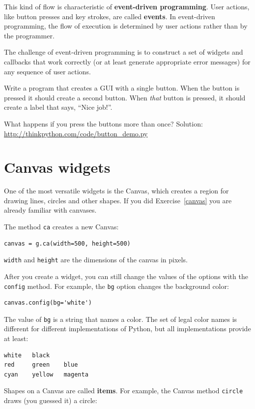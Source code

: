 \documentclass[10pt]{book}
\begin{document}
This kind of flow is characteristic of {\bf event-driven programming}.
User actions, like button presses and key strokes, are called {\bf
events}.  In event-driven programming, the flow of execution is
determined by user actions rather than by the programmer.

The challenge of event-driven programming is to construct a set of
widgets and callbacks that work correctly (or at least generate
appropriate error messages) for any sequence of user actions.

\begin{exercise}

Write a program that creates a GUI with a single button.  When the
button is pressed it should create a second button.  When
{\em that} button is pressed, it should create a label that
says, ``Nice job!''.

What happens if you press the buttons more than once?
Solution: \url{http://thinkpython.com/code/button_demo.py}

\end{exercise}


\section{Canvas widgets}

One of the most versatile widgets is the Canvas, which creates
a region for drawing lines, circles and other shapes.  If you
did Exercise~\ref{canvas} you are already familiar with canvases.

The method {\tt ca} creates a new Canvas:

\begin{verbatim}
canvas = g.ca(width=500, height=500)
\end{verbatim}
%
{\tt width} and {\tt height} are the dimensions of the canvas
in pixels.

After you create a widget, you can still change the values of
the options with the
{\tt config} method.  For example, the {\tt bg} option changes
the background color:

\begin{verbatim}
canvas.config(bg='white')
\end{verbatim}
%
The value of {\tt bg} is a string
that names a color.  The set of legal color names is different
for different implementations of Python, but all implementations
provide at least:

\begin{verbatim}
white   black
red     green    blue
cyan    yellow   magenta
\end{verbatim}
%
Shapes on a Canvas are called {\bf items}.  For example,
the Canvas method {\tt circle} draws (you guessed it) a circle:
\end{document}

